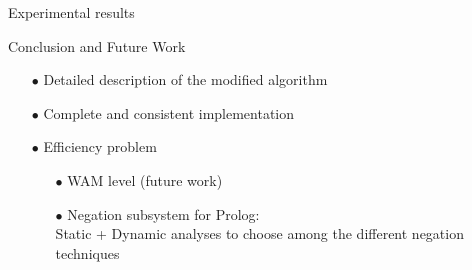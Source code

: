 \documentclass[pdf,slideColor,contemporain]{prosper}
\begin{document}

\begin{slide}{Experimental results}
\vspace{-0.2cm}
 
\begin{tiny}
 
\end{tiny}

\end{slide}


\begin{slide}{Conclusion and Future Work}

\vspace{1cm}
        \begin{itemize}
                \item[{\blue $\bullet$}] Detailed description of the modified {\blue algorithm}
                \item[{\blue $\bullet$}] Complete and consistent {\blue implementation}
                \item[$\bullet$] {\blue Efficiency} problem
                  \begin{itemize}
                  \item[{\blue $\bullet$}] WAM level (future work)
                  \item[{\blue $\bullet$}] Negation subsystem for Prolog: \\
                    Static + Dynamic analyses to choose among the different negation techniques
                  \end{itemize}
        \end{itemize}
\end{slide}


\maketitle
\end{document}
